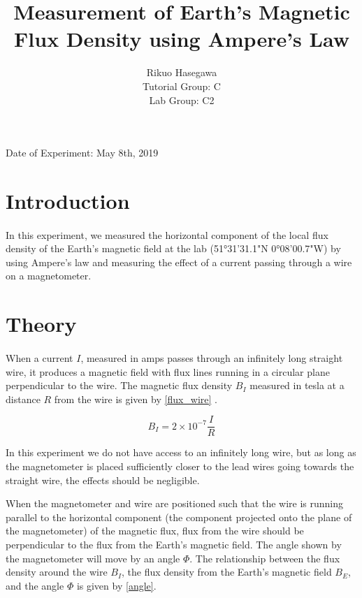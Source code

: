\documentclass{article}
\title{Measurement of Earth's Magnetic Flux Density using Ampere's Law}
\author{ Rikuo Hasegawa
  \\ Tutorial Group: C
  \\ Lab Group: C2 }
\begin{document}
\maketitle
\thispagestyle{fancy}
\vspace*{\fill}
\parbox{\linewidth}{\centering%
Date of Experiment: May 8th, 2019
}
\newpage


\section{Introduction}
\paragraph{}
In this experiment, we measured the horizontal component of the local flux density of the Earth's magnetic field at the lab (51°31'31.1"N 0°08'00.7"W) by using Ampere's law and measuring the effect of a current passing through a wire on a magnetometer.

\section{Theory}
\paragraph{}
When a current \(I\), measured in amps passes through an infinitely long straight wire, it produces a magnetic field with flux lines running in a circular plane perpendicular to the wire. The magnetic flux density \(B_I\) measured in tesla at a distance \(R\) from the wire is given by \eqref{flux_wire} \autocite{UPCSE2018}.

\begin{equation}\label{flux_wire}
  B_I = 2 \times 10^{-7} \frac{I}{R}
\end{equation}

In this experiment we do not have access to an infinitely long wire, but as long as the magnetometer is placed sufficiently closer to the lead wires going towards the straight wire, the effects should be negligible.

When the magnetometer and wire are positioned such that the wire is running parallel to the horizontal component (the component projected onto the plane of the magnetometer) of the magnetic flux, flux from the wire should be perpendicular to the flux from the Earth's magnetic field. The angle shown by the magnetometer will move by an angle \(\Phi\). The relationship between the flux density around the wire \(B_I\), the flux density from the Earth's magnetic field \(B_E\), and the angle \(\Phi\) is given by \eqref{angle}.
\end{document}
